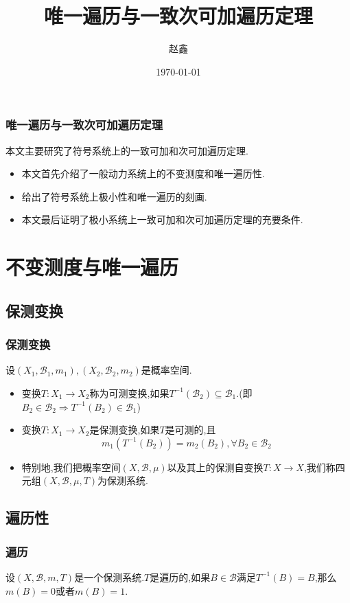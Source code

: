 \documentclass[compress,red]{beamer}
\begin{document}
\title{唯一遍历与一致次可加遍历定理}
\author{赵鑫}
\date{\today}



\frame{\titlepage}





\begin{frame}
\frametitle{唯一遍历与一致次可加遍历定理}
本文主要研究了符号系统上的一致可加和次可加遍历定理.

\begin{itemize}
\item 本文首先介绍了一般动力系统上的不变测度和唯一遍历性.\pause

\item 给出了符号系统上极小性和唯一遍历的刻画.\pause

\item 本文最后证明了极小系统上一致可加和次可加遍历定理的充要条件.
\end{itemize}
\end{frame}
\section{不变测度与唯一遍历}
\subsection{保测变换}
\begin{frame}
\frametitle{保测变换}
\begin{definition}
设$(X_1,\mathscr{B}_1,m_1),(X_2,\mathscr{B}_2,m_2)$是概率空间.
\begin{itemize}
\item<1-> 变换$T:X_1 \rightarrow X_2$称为可测变换,如果$T^{-1}(\mathscr{B}_2) \subseteq \mathscr{B}_1$.(即\
$B_2 \in \mathscr{B}_2\Rightarrow T^{-1}(B_2) \in \mathscr{B}_1$)
\item<2-> 变换$T:X_1 \rightarrow X_2$是保测变换,如果$T$是可测的,且
$$m_1(T^{-1}(B_2))=m_2(B_2), \forall B_2 \in \mathscr{B}_2$$
\item<3-> 特别地,我们把概率空间$(X,\mathscr{B},\mu)$以及其上的保测自变换$T:X\rightarrow X$,我们称四元组$(X,\mathscr{B},\mu,T)$为保测系统.
\end{itemize}
\end{definition}
\end{frame}



\subsection{遍历性}
\begin{frame}
\frametitle{遍历}
\begin{definition}
设$(X,\mathscr{B},m,T)$是一个保测系统.$T$是遍历的,如果$B\in\mathscr{B} $满足$T^{-1}(B)=B$,那么$m(B)=0$或者$m(B)=1$.
\end{definition}
\end{frame}
\end{document}
